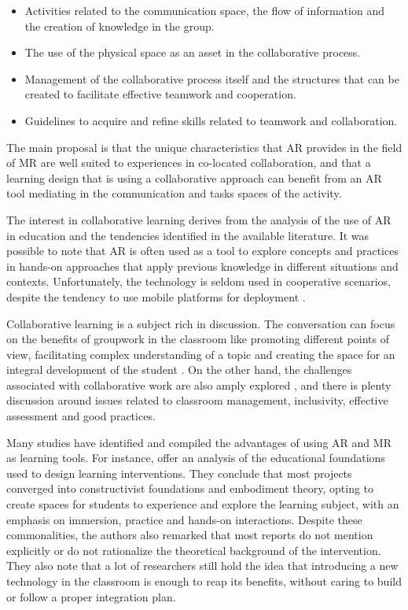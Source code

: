 \begin{itemize}
    \item Activities related to the communication space, the flow of information and the creation of knowledge in the group.
    \item The use of the physical space as an asset in the collaborative process.
    \item Management of the collaborative process itself and the structures that can be created to facilitate effective teamwork and cooperation.
    \item Guidelines to acquire and refine skills related to teamwork and collaboration.
\end{itemize}

The main proposal is that the unique characteristics that \ac{AR} provides in the field of \ac{MR} are well suited to experiences in co-located
collaboration, and that a learning design that is using a collaborative approach can benefit from an \ac{AR} tool mediating in the communication and tasks
spaces of the activity.

The interest in collaborative learning derives from the analysis of the use of \ac{AR} in education and the tendencies identified in the available
literature. It was possible to note that \ac{AR} is often used as a tool to explore concepts and practices in hands-on approaches that apply previous
knowledge in different situations and contexts. Unfortunately, the technology is seldom used in cooperative scenarios, despite the tendency to use mobile
platforms for deployment \parencite{gil_2023}.

Collaborative learning is a subject rich in discussion. The conversation can focus on the benefits of groupwork in the classroom like promoting different
points of view, facilitating complex understanding of a topic and creating the space for an integral development of the student \parencite{van_wyk_2017,smith_1992}.
On the other hand, the challenges associated with collaborative work are also amply explored \parencite{baloche_2017,popov_2012,buchs_2017}, and there is
plenty discussion around issues related to classroom management, inclusivity, effective assessment and good practices.

Many studies have identified and compiled the advantages of using \ac{AR} and \ac{MR} as learning tools. For instance, \textcite{penn_2023} offer an
analysis of the educational foundations used to design learning interventions. They conclude that most projects converged into constructivist foundations
and embodiment theory, opting to create spaces for students to experience and explore the learning subject, with an emphasis on immersion, practice and
hands-on interactions. Despite these commonalities, the authors also remarked that most reports do not mention explicitly or do not rationalize the
theoretical background of the intervention.  They also note that a lot of researchers still hold the idea that introducing a new technology in the
classroom is enough to reap its benefits, without caring to build or follow a proper integration plan.

